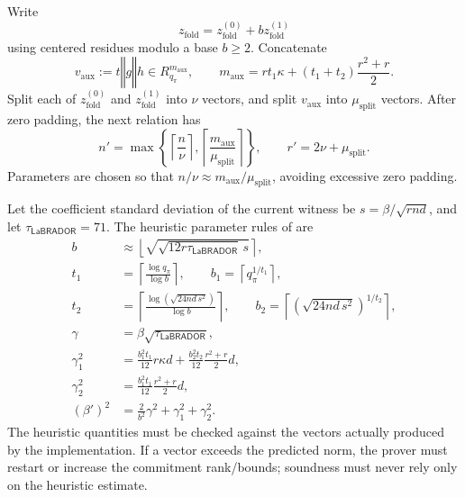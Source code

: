 \documentclass[11pt,a4paper]{article}
\newcommand{\Rpi}{R_{q_{\pi}}}
\newcommand{\proofmod}{q_{\pi}}
\newcommand{\LaB}{\mathsf{LaBRADOR}}
\newcommand{\concat}{\mathbin\Vert}
\begin{document}
Write
\begin{equation}
  z_{\mathrm{fold}}
  =z_{\mathrm{fold}}^{(0)}+b z_{\mathrm{fold}}^{(1)}
  \label{eq:z-decomposition}
\end{equation}
using centered residues modulo a base \(b\ge2\).  Concatenate
\[
  v_{\mathrm{aux}}:=t\concat g\concat h\in\Rpi^{m_{\mathrm{aux}}},
  \qquad
  m_{\mathrm{aux}}
  =rt_1\kappa+(t_1+t_2)\frac{r^2+r}{2}.
\]
Split each of \(z_{\mathrm{fold}}^{(0)}\) and
\(z_{\mathrm{fold}}^{(1)}\) into \(\nu\) vectors, and split
\(v_{\mathrm{aux}}\) into \(\mu_{\mathrm{split}}\) vectors.  After zero
padding, the next relation has
\begin{equation}
 n'=\max\left\{\left\lceil\frac{n}{\nu}\right\rceil,
                 \left\lceil\frac{m_{\mathrm{aux}}}{\mu_{\mathrm{split}}}
                 \right\rceil\right\},
 \qquad
 r'=2\nu+\mu_{\mathrm{split}}.
 \label{eq:next-rank-multiplicity}
\end{equation}
Parameters are chosen so that
\(n/\nu\approx m_{\mathrm{aux}}/\mu_{\mathrm{split}}\), avoiding excessive
zero padding.

Let the coefficient standard deviation of the current witness be
\(s=\beta/\sqrt{rnd}\), and let
\(\tau_{\LaB}=71\).  The heuristic parameter rules of \cite{BS23} are
\begin{align}
 b&\approx\left\lfloor\sqrt{\sqrt{12r\tau_{\LaB}}\,s}\right\rceil,
 \label{eq:base-b}\\
 t_1&=\left\lceil\frac{\log\proofmod}{\log b}\right\rceil,
 \qquad b_1=\left\lceil\proofmod^{1/t_1}\right\rceil,
 \label{eq:t1}\\
 t_2&=\left\lceil
 \frac{\log(\sqrt{24nd\,s^2})}{\log b}
 \right\rceil,
 \qquad
 b_2=\left\lceil(\sqrt{24nd\,s^2})^{1/t_2}\right\rceil,
 \label{eq:t2}\\
 \gamma&=\beta\sqrt{\tau_{\LaB}},
 \label{eq:gamma-lab}\\
 \gamma_1^2&=\frac{b_1^2t_1}{12}r\kappa d
       +\frac{b_2^2t_2}{12}\frac{r^2+r}{2}d,
 \label{eq:gamma1-lab}\\
 \gamma_2^2&=\frac{b_1^2t_1}{12}\frac{r^2+r}{2}d,
 \label{eq:gamma2-lab}\\
 (\beta')^2&=\frac{2}{b^2}\gamma^2+\gamma_1^2+\gamma_2^2.
 \label{eq:beta-prime}
\end{align}
The heuristic quantities must be checked against the vectors actually produced
by the implementation.  If a vector exceeds the predicted norm, the prover
must restart or increase the commitment rank/bounds; soundness must never rely
only on the heuristic estimate.
\end{document}
